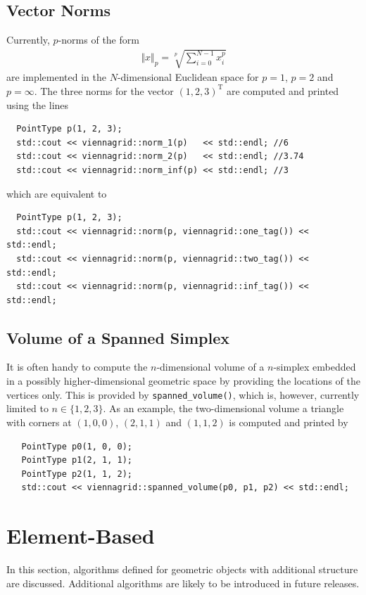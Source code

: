   \subsection{Vector Norms}
 Currently, $p$-norms of the form
  \begin{align}
   \Vert x \Vert_p = \sqrt[p]{\sum_{i=0}^{N-1} x_i^p}
  \end{align}
 are implemented in the $N$-dimensional Euclidean space for $p=1$, $p=2$ and $p=\infty$. The three norms for the vector $(1,2,3)^\mathrm{T}$ are computed and printed using the lines
 \begin{lstlisting}
  PointType p(1, 2, 3);
  std::cout << viennagrid::norm_1(p)   << std::endl; //6
  std::cout << viennagrid::norm_2(p)   << std::endl; //3.74
  std::cout << viennagrid::norm_inf(p) << std::endl; //3
 \end{lstlisting}
which are equivalent to
 \begin{lstlisting}
  PointType p(1, 2, 3);
  std::cout << viennagrid::norm(p, viennagrid::one_tag()) << std::endl;
  std::cout << viennagrid::norm(p, viennagrid::two_tag()) << std::endl;
  std::cout << viennagrid::norm(p, viennagrid::inf_tag()) << std::endl;
 \end{lstlisting}


  \subsection{Volume of a Spanned Simplex}
  It is often handy to compute the $n$-dimensional volume of a $n$-simplex embedded in a possibly higher-dimensional geometric space by providing the locations of the vertices only.
  This is provided by \lstinline|spanned_volume()|, which is, however, currently limited to $n \in \{1, 2, 3\}$.
  As an example, the two-dimensional volume a triangle with corners at $(1, 0, 0)$, $(2, 1, 1)$ and $(1, 1, 2)$ is computed and printed by
  \begin{lstlisting}
   PointType p0(1, 0, 0);
   PointType p1(2, 1, 1);
   PointType p2(1, 1, 2);
   std::cout << viennagrid::spanned_volume(p0, p1, p2) << std::endl;
  \end{lstlisting}



\section{Element-Based}
In this section, algorithms defined for geometric objects with additional structure are discussed. Additional algorithms are likely to be introduced in future releases.

